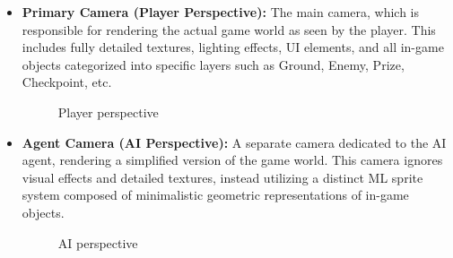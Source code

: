 \documentclass[12pt,oneside,openright,a4paper]{cpe-english-project}
\begin{document}
\begin{itemize}
\item  \textbf{Primary Camera (Player Perspective):}
The main camera, which is responsible for rendering the actual game world as seen by the player. This includes fully detailed textures, lighting effects, UI elements, and all in-game objects categorized into specific layers such as Ground, Enemy, Prize, Checkpoint, etc.
\begin{figure}[H]
\centering
{}
\caption{Player perspective}\label{fig:PlayerPers}
\end{figure}
\item  \textbf{Agent Camera (AI Perspective):}
A separate camera dedicated to the AI agent, rendering a simplified version of the game world. This camera ignores visual effects and detailed textures, instead utilizing a distinct ML sprite system composed of minimalistic geometric representations of in-game objects.
\begin{figure}[H]
\centering
{}
\caption{AI perspective}\label{fig:AIPers}
\end{figure}
\end{itemize}
\end{document}
